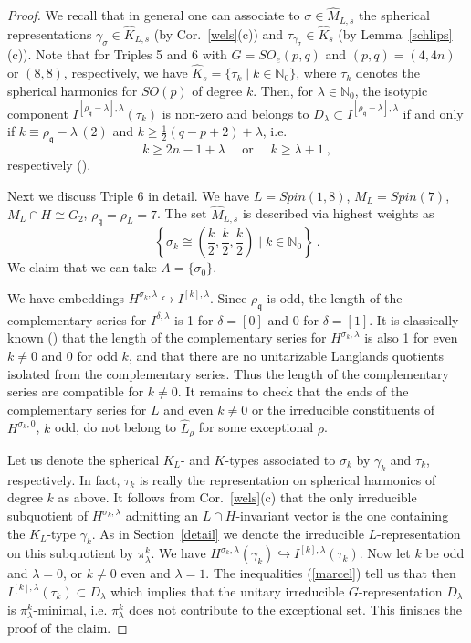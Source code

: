 \documentclass[10]{amsart}
\theoremstyle{remark}
\theoremstyle{definition}
\numberwithin{equation}{section}
\newcommand{\N}{\mathbb{N}}           %
\newcommand{\fq}{{\mathfrak q}}
\newcommand{\be}{\begin{equation}}
\begin{document}
{\begin{proof}
We recall that in general one can associate to $\sigma\in\widehat M_{L,s}$ the spherical representations $\gamma_\sigma\in \widehat K_{L,s}$ (by Cor.~\ref{wels}(c)) and
$\tau_{\gamma_\sigma}\in\widehat K_s$ (by Lemma~\ref{schlips}(c)). Note that for Triples 5 and 6 with $G=SO_e(p,q)$ and $(p,q)=(4,4n)$ or $(8,8)$, respectively, we have
$\widehat K_s=\{\tau_k\mid k\in\N_0\}$, where $\tau_k$ denotes the spherical harmonics for $SO(p)$ of degree $k$. Then, for $\lambda\in\N_0$, the isotypic
component $I^{[\rho_\fq-\lambda],\lambda}(\tau_k)$ is non-zero and belongs to $D_\lambda\subset I^{[\rho_\fq-\lambda],\lambda}$ if and only if $k\equiv \rho_\fq-\lambda\, (2)$ and
$k\ge \frac{1}{2}(q-p+2)+\lambda$,
i.e. 
\be\label{marcel}
k\ge 2n-1+\lambda\quad\mbox{ or }\quad k\ge \lambda+1\ ,
\end{equation} 
respectively (\cite{HoTa93}).

Next we discuss Triple 6 in detail. We have $L=Spin(1,8)$, $M_L=Spin(7)$, $M_L\cap H\cong G_2$, $\rho_\fq=\rho_L=7$. The set $\widehat M_{L,s}$ is described via highest weights as
$$\left\{\sigma_k\cong\left (\frac{k}{2},\frac{k}{2},\frac{k}{2}\right )\mid k\in\N_0\right\}\ .$$
We claim that we can take $A=\{\sigma_0\}$.

We have embeddings $H^{\sigma_k,\lambda}\hookrightarrow I^{[k],\lambda}$. Since $\rho_\fq$ is odd, the length of the complementary series for $I^{\delta,\lambda}$ is 1 for
$\delta=[0]$ and 0 for $\delta=[1]$. It is classically known (\cite{KnS71}) that the length of the complementary series  for $H^{\sigma_k,\lambda}$ is also 1 for even $k\ne 0$
and $0$ for odd $k$, and that there are no unitarizable Langlands quotients isolated from the complementary series. Thus the length of the complementary series are compatible for 
$k\ne 0$. It remains to check that the ends of the complementary series for $L$ and even $k\ne 0$ or the irreducible constituents of $H^{\sigma_k,0}$, $k$ odd, do not belong to $\widehat L_\rho$ for some exceptional $\rho$.

Let us denote the spherical $K_L$- and $K$-types associated to $\sigma_k$ by $\gamma_k$ and $\tau_k$, respectively. In fact, $\tau_k$ is really the representation on spherical
harmonics of degree $k$ as above. It follows from Cor.~\ref{wels}(c) that the only irreducible subquotient of $H^{\sigma_k,\lambda}$ admitting an $L\cap H$-invariant vector is the one
containing the $K_L$-type $\gamma_k$. As in Section~\ref{detail} we denote the irreducible $L$-representation on this subquotient by $\pi^k_\lambda$.  
We have $H^{\sigma_k,\lambda}(\gamma_k)\hookrightarrow I^{[k],\lambda}(\tau_k)$. Now let $k$ be odd and $\lambda=0$, or $k\ne 0$ even and $\lambda=1$. The
inequalities (\ref{marcel}) tell us that then $I^{[k],\lambda}(\tau_k)\subset D_\lambda$ which implies that the unitary irreducible $G$-representation $D_\lambda$ is $\pi^k_\lambda$-minimal, i.e.
$\pi^k_\lambda$ does not contribute to the exceptional set. This finishes the proof of the claim.


\end{proof}}
\end{document}
